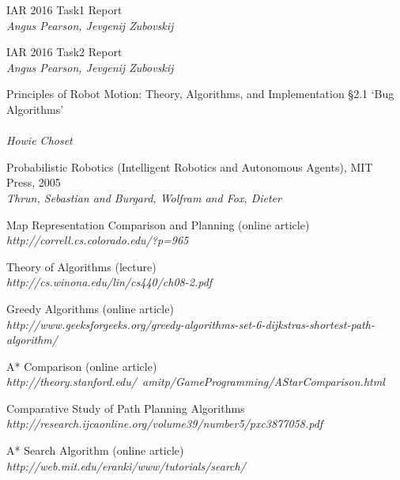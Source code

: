 \documentclass[11pt, a4paper]{article}
\begin{document}
\newpage
\begin{thebibliography}{}

\par{IAR 2016 Task1 Report}
\\
\textit{Angus Pearson, Jevgenij Zubovskij}

\par{IAR 2016 Task2 Report}
\\
\textit{Angus Pearson, Jevgenij Zubovskij}


\par{Principles of Robot Motion: Theory, Algorithms, and Implementation \S2.1 `Bug Algorithms'}\\
\\
\textit{Howie Choset}


\par{Probabilistic Robotics (Intelligent Robotics and Autonomous Agents), MIT Press, 2005}
\\
\textit{Thrun, Sebastian and Burgard, Wolfram and Fox, Dieter}

\par{Map Representation Comparison and Planning (online article)}
\\
\textit{http://correll.cs.colorado.edu/?p=965}



\par{Theory of Algorithms (lecture)}
\\
\textit{http://cs.winona.edu/lin/cs440/ch08-2.pdf}

\par{Greedy Algorithms (online article)}
\\
\textit{http://www.geeksforgeeks.org/greedy-algorithms-set-6-dijkstras-shortest-path-algorithm/}

\par{A* Comparison (online article)}
\\
\textit{http://theory.stanford.edu/~amitp/GameProgramming/AStarComparison.html}

\par{Comparative Study of Path Planning Algorithms}
\\
\textit{http://research.ijcaonline.org/volume39/number5/pxc3877058.pdf}

\par{A* Search Algorithm (online article)}
\\
\textit{http://web.mit.edu/eranki/www/tutorials/search/}




\end{thebibliography}
\end{document}

